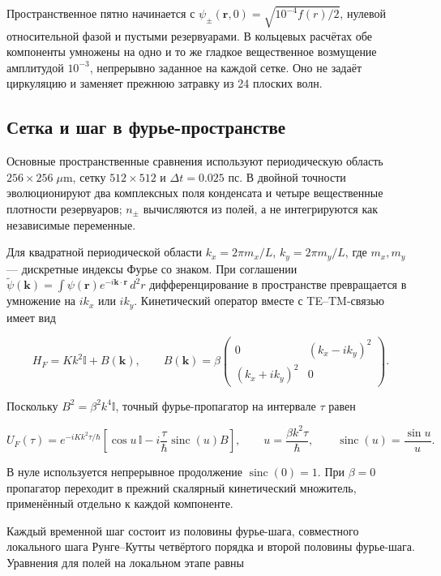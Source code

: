 \documentclass[12pt,a4paper]{article}
\begin{document}
Пространственное пятно начинается с \(\psi_\pm(\mathbf r,0)=\sqrt{10^{-4}f(r)/2}\), нулевой относительной фазой и пустыми резервуарами. В кольцевых расчётах обе компоненты умножены на одно и то же гладкое вещественное возмущение амплитудой \(10^{-3}\), непрерывно заданное на каждой сетке. Оно не задаёт циркуляцию и заменяет прежнюю затравку из 24 плоских волн.

\subsection{Сетка и шаг в фурье-пространстве}

Основные пространственные сравнения используют периодическую область \(256\times256\;\mu\mathrm m\), сетку \(512\times512\) и \(\Delta t=0.025\) пс. В двойной точности эволюционируют два комплексных поля конденсата и четыре вещественные плотности резервуаров; \(n_\pm\) вычисляются из полей, а не интегрируются как независимые переменные.

Для квадратной периодической области \(k_x=2\pi m_x/L\), \(k_y=2\pi m_y/L\), где \(m_x,m_y\) --- дискретные индексы Фурье со знаком. При соглашении \(\widetilde\psi(\mathbf k)=\int\psi(\mathbf r)e^{-i\mathbf k\cdot\mathbf r}\,d^2r\) дифференцирование в пространстве превращается в умножение на \(ik_x\) или \(ik_y\). Кинетический оператор вместе с TE--TM-связью имеет вид

\[
H_F=Kk^2\mathbb I+B(\mathbf k),\qquad
B(\mathbf k)=\beta\begin{pmatrix}
0&(k_x-ik_y)^2\\
(k_x+ik_y)^2&0
\end{pmatrix}.
\tag{24}\label{eq:24}
\]

Поскольку \(B^2=\beta^2 k^4\mathbb I\), точный фурье-пропагатор на интервале \(\tau\) равен

\[
U_F(\tau)=e^{-iKk^2\tau/\hbar}
\left[\cos u\,\mathbb I-i\frac{\tau}{\hbar}\operatorname{sinc}(u)B\right],
\qquad u=\frac{\beta k^2\tau}{\hbar},\qquad
\operatorname{sinc}(u)=\frac{\sin u}{u}.
\tag{25}\label{eq:25}
\]

В нуле используется непрерывное продолжение \(\operatorname{sinc}(0)=1\). При \(\beta=0\) пропагатор переходит в прежний скалярный кинетический множитель, применённый отдельно к каждой компоненте.

Каждый временной шаг состоит из половины фурье-шага, совместного локального шага Рунге--Кутты четвёртого порядка и второй половины фурье-шага. Уравнения для полей на локальном этапе равны
\end{document}
